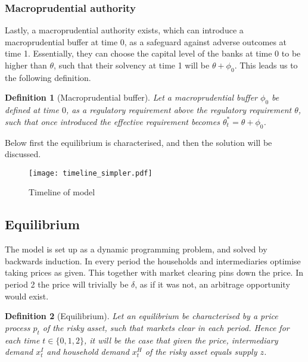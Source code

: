 \documentclass[11pt]{article}
\newtheorem{definition}{Definition}%
\begin{document}
\subsubsection*{Macroprudential authority}
Lastly, a macroprudential authority exists, which can introduce a macroprudential buffer at time 0, as a safeguard against adverse outcomes at time 1. Essentially, they can choose the capital level of the banks at time 0 to be higher than $\theta$, such that their solvency at time 1 will be $\theta + \phi_0$. This leads us to the following definition.


\begin{definition}[Macroprudential buffer]
Let a macroprudential buffer $\phi_0$ be defined at time $0$, as a regulatory requirement above the regulatory requirement $\theta$, such that once introduced the effective requirement becomes $\theta^*_t = \theta + \phi_0$.
\end{definition}


Below first the equilibrium is characterised, and then the solution will be discussed.

\begin{figure}[h]
\centering
\texttt{[image: timeline\_simpler.pdf]}
\caption{Timeline of model\\
}
\label{fig:timeline}
\end{figure}


\subsection*{Equilibrium}
The model is set up as a dynamic programming problem, and solved by backwards induction. 
In every period the households and intermediaries optimise taking prices as given. This together with market clearing pins down the price.
In period 2 the price will trivially be $\delta$, as if it was not, an arbitrage opportunity would exist.


\begin{definition}[Equilibrium] \label{d_eqm}
Let an equilibrium be characterised by a price process $p_t$ of the risky asset, such that markets clear in each period. Hence for each time $t\in\{0,1,2\}$, it will be the case that given the price, intermediary demand $x^I_t$ and household demand $x^H_t$ of the risky asset equals supply $z$.
\end{definition}
\end{document}
